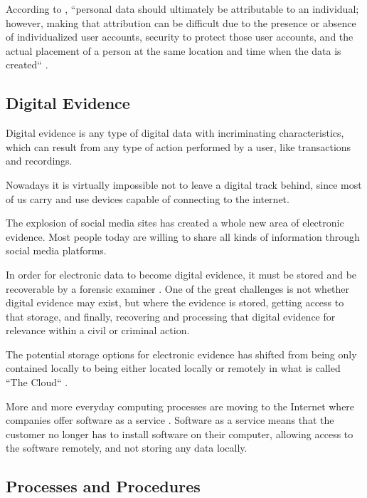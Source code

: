 According to , ``personal data should ultimately be attributable to an individual; however, making
that attribution can be difficult due to the presence or absence of individualized
user accounts, security to protect those user accounts, and the actual placement of a
person at the same location and time when the data is created`` \cite{daniels}.

\subsection{Digital Evidence}

Digital evidence is any type of digital data with incriminating characteristics,
which can result from any type of action performed by a user, like transactions and
recordings.

Nowadays it is virtually impossible not to leave a digital track behind, since most
of us carry and use devices capable of connecting to the internet.

The explosion of social media \cite{daniels} sites has created a whole new area of electronic
evidence. Most people today are willing to share all kinds of information through
social media platforms.

In order for electronic data to become digital evidence, it must be stored and be recoverable
by a forensic examiner \cite{daniels}. One of the great challenges is not whether digital
evidence may exist, but where the evidence is stored, getting access to that storage,
and finally, recovering and processing that digital evidence for relevance within
a civil or criminal action.

The potential storage options for electronic evidence has shifted from being only contained locally
to being either located locally or remotely in what is called ``The Cloud`` \cite{cloud}. 

More and more everyday computing processes are moving to the Internet
where companies offer software as a service \cite{saas}. Software as a service means that
the customer no longer has to install software on their computer, allowing access to the software remotely,
and not storing any data locally.


\subsection{Processes and Procedures}

